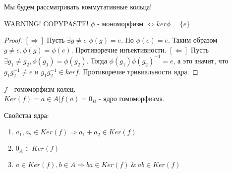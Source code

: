 Мы будем рассматривать коммутативные кольца!

\begin{thm}
WARNING! COPYPASTE!
$ \phi $ - мономорфизм $ \Leftrightarrow ker \phi = \{e\} $
\end{thm}
\begin{proof}
  $ [\Rightarrow] $ Пусть $ \exists g \ne e $ $ \phi(g) = e $. Но $ \phi(e) = e $. Таким образом $ g \ne e, \phi(g) = \phi(e) $. 
  Противоречие инъективности. \newline
  $ [\Leftarrow] $ Пусть $ \exists g_{1} \ne g_{2}, \phi(g_{1}) = \phi(g_{2}) $. Тогда $ \phi(g_{1})\phi(g_{2})^{-1} = e $,
  а это значит, что $ g_{1}g_{2}^{-1} \ne e $ и $ g_{1}g_{2}^{-1} \in ker f $. Противоречие тривиальности ядра. 
\end{proof}

\begin{defn}
$f$ - гомоморфизм колец.\\
$Ker(f) = {a \in A| f(a) = 0_B}$ - ядро гомоморфизма.
\end{defn}

Свойства ядра:
\begin{enumerate}
 \item $a_1, a_2 \in Ker(f) \Rightarrow a_1 + a_2 \in Ker(f)$
 \item $0_A \in Ker(f)$
 \item $a \in Ker(f), b \in A \Rightarrow ba \in Ker(f)~\&~ab \in Ker(f)$
\end{enumerate}

